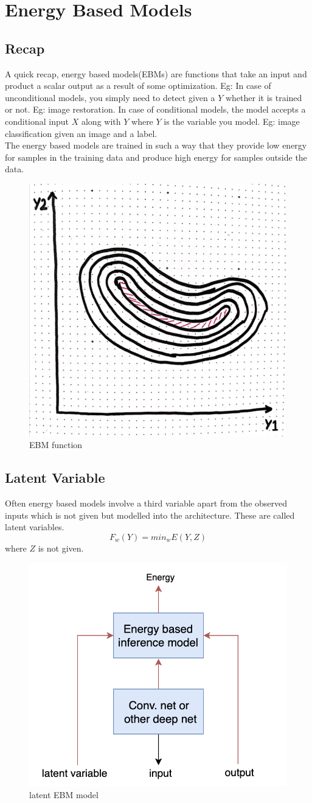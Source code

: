 \chapter{Energy Based Models}

\section{Recap}

A quick recap, energy based models(EBMs) are functions that take an input and product a scalar output as a result of some optimization. Eg:
In case of unconditional models, you simply need to detect given a $Y$ whether it is trained or not. Eg: image restoration.
In case of conditional models, the model accepts a conditional input $X$ along with $Y$ where $Y$ is the variable you model. Eg: image classification given an image and a label.\\

The energy based models are trained in such a way that they provide low energy for samples in the training data and produce high energy for samples outside the data.
\begin{figure}[!h]
    \centering
    \includegraphics[width=0.4\linewidth]{lectures/08-a/images/EBM_function.png}
    \caption{EBM function}
    \label{fig:EBM_function}
\end{figure}
\section{Latent Variable}
Often energy based models involve a third variable apart from the observed inputs which is not given but modelled into the architecture. These are called latent variables.
\begin{equation}
    F_{w}(Y) = min_{w} E(Y, Z)
\end{equation}
where $Z$ is not given.
\begin{figure}[!h]
    \centering
    \includegraphics[width=0.4\linewidth]{lectures/08-a/images/latent_EBM_architecture.png}
    \caption{latent EBM model}
    \label{fig:latent_EBM_model}
\end{figure}
